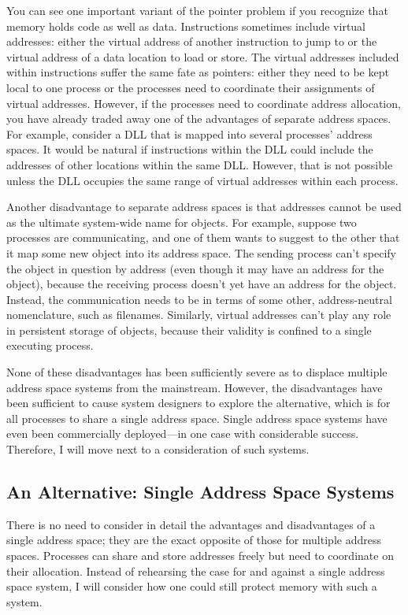 You can see one important variant of the pointer problem if you
recognize that memory holds code as well as data.  Instructions
sometimes include virtual addresses: either the virtual address of
another instruction to jump to or the virtual address of a data
location to load or store.  The virtual addresses included within
instructions suffer the same fate
as pointers: either they need to be kept local to one process or the
processes need to coordinate their assignments of virtual addresses.
However, if the processes need to coordinate address allocation, you have
already traded away one of the advantages of separate address spaces.
For example, consider a DLL that is mapped into several processes'
address spaces.  It would be natural if instructions within the DLL
could include the addresses of other locations within the same DLL.  However,
that is not possible unless the DLL occupies the same range of
virtual addresses within each process.

Another disadvantage to separate address spaces is that addresses
cannot be used as the ultimate system-wide name for objects. For
example, suppose two processes are communicating, and one of them
wants to suggest to the other that it map some new object into its address space.
The sending process can't specify the object in question by address (even
though it may have an address for the object), because the receiving process
doesn't yet have an address for the object.  Instead, the
communication needs to be in terms of some other, address-neutral
nomenclature, such as filenames.  Similarly, virtual addresses can't
play any role in persistent storage of objects, because their validity
is confined to a single executing process.

None of these disadvantages has been sufficiently severe as to
displace multiple address space systems from the mainstream.  However,
the disadvantages have been sufficient to cause system designers to explore the
alternative, which is for all processes to share a single address space.
Single address space systems have
even been commercially deployed---in one case with considerable success.
Therefore, I will move next to a consideration of such systems.

\subsection{An Alternative: Single Address Space
  Systems}\label{single-address-space-subsection}

There is no need to consider in detail the advantages and
disadvantages of a single address space; they are the exact opposite
of those for multiple address spaces.  Processes can share and store
addresses freely but need to coordinate on their allocation.  Instead
of rehearsing the case for and against a single address space system,
I will consider how one could still protect memory with such a system.

